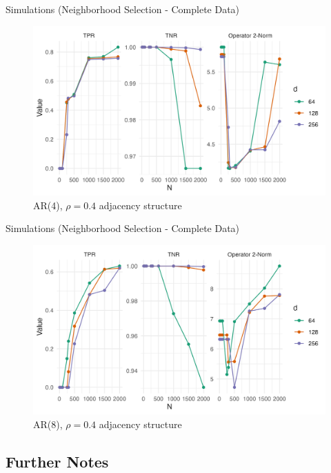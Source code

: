 \documentclass{beamer}
\begin{document}
\begin{frame}{Simulations (Neighborhood Selection - Complete Data)}
    \begin{figure}
        \centering 
        \includegraphics[scale=0.65]{glasso_complete_fixN_b4mb.png}
        \caption{AR(4), $\rho=0.4$ adjacency structure}
    \end{figure}
\end{frame}


\begin{frame}{Simulations (Neighborhood Selection - Complete Data)}
    \begin{figure}
        \centering 
        \includegraphics[scale=0.65]{glasso_complete_fixN_b8mb.png}
        \caption{AR(8), $\rho=0.4$ adjacency structure}
    \end{figure}
\end{frame}



\subsection{Further Notes}
\end{document}
